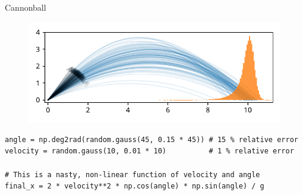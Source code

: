 \documentclass[12pt, aspectratio=149]{beamer}
\theoremstyle{plain}
\begin{document}
\begin{frame}[fragile]{Cannonball}
\vspace*{-1em}
\begin{center}
 \begin{figure}
    	\centering
    	\includegraphics[width=0.99\linewidth]{figures/cannonball_sim1}
 \end{figure}
 \end{center}
 \vspace*{-2em}

\begin{center}
\begin{verbatim} 
angle = np.deg2rad(random.gauss(45, 0.15 * 45)) # 15 % relative error
velocity = random.gauss(10, 0.01 * 10)          # 1 % relative error

# This is a nasty, non-linear function of velocity and angle
final_x = 2 * velocity**2 * np.cos(angle) * np.sin(angle) / g
\end{verbatim}
\end{center}
\end{frame}
\end{document}
